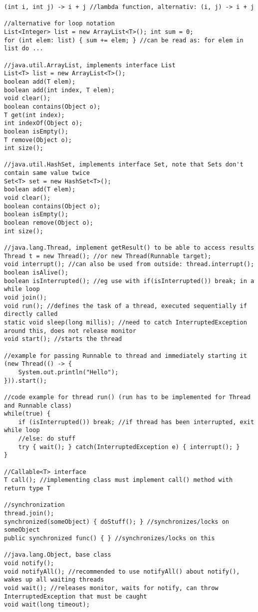 \documentclass{article}
\begin{document}
\begin{verbatim}
(int i, int j) -> i + j //lambda function, alternativ: (i, j) -> i + j

//alternative for loop notation
List<Integer> list = new ArrayList<T>(); int sum = 0;
for (int elem: list) { sum += elem; } //can be read as: for elem in list do ...

//java.util.ArrayList, implements interface List
List<T> list = new ArrayList<T>();
boolean add(T elem);
boolean add(int index, T elem);
void clear();
boolean contains(Object o);
T get(int index);
int indexOf(Object o);
boolean isEmpty();
T remove(Object o);
int size();

//java.util.HashSet, implements interface Set, note that Sets don't contain same value twice
Set<T> set = new HashSet<T>();
boolean add(T elem);
void clear();
boolean contains(Object o);
boolean isEmpty();
boolean remove(Object o);
int size();

//java.lang.Thread, implement getResult() to be able to access results
Thread t = new Thread(); //or new Thread(Runnable target);
void interrupt(); //can also be used from outside: thread.interrupt();
boolean isAlive();
boolean isInterrupted(); //eg use with if(isInterrupted()) break; in a while loop
void join();
void run(); //defines the task of a thread, executed sequentially if directly called
static void sleep(long millis); //need to catch InterruptedException around this, does not release monitor
void start(); //starts the thread

//example for passing Runnable to thread and immediately starting it
(new Thread(() -> {
    System.out.println("Hello");
})).start();

//code example for thread run() (run has to be implemented for Thread and Runnable class)
while(true) {
    if (isInterrupted()) break; //if thread has been interrupted, exit while loop
    //else: do stuff
    try { wait(); } catch(InterruptedException e) { interrupt(); }
}

//Callable<T> interface
T call(); //implementing class must implement call() method with return type T

//synchronization
thread.join();
synchronized(someObject) { doStuff(); } //synchronizes/locks on someObject
public synchronized func() { } //synchronizes/locks on this

//java.lang.Object, base class
void notify();
void notifyAll(); //recommended to use notifyAll() about notify(), wakes up all waiting threads
void wait(); //releases monitor, waits for notify, can throw InterruptedException that must be caught
void wait(long timeout);


\end{verbatim}
\end{document}

